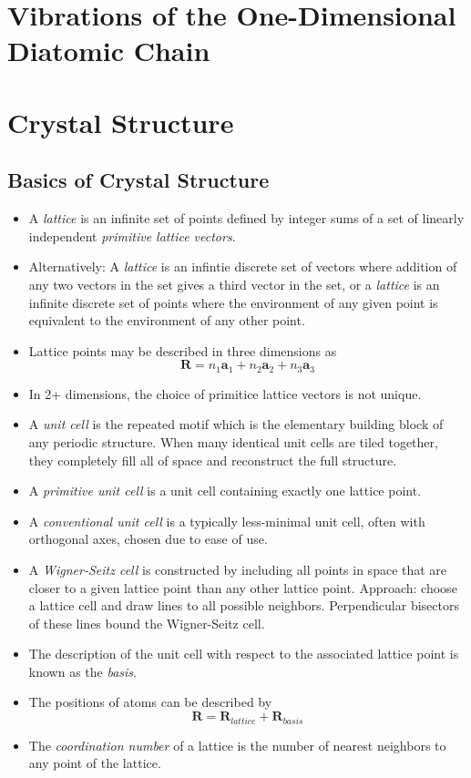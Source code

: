 \documentclass[10pt]{article}
\begin{document}
\section{Vibrations of the One-Dimensional Diatomic Chain}


\section{Crystal Structure}
\subsection{Basics of Crystal Structure}
\begin{itemize}
\item A \emph{lattice} is an infinite set of points defined by integer sums of a set of linearly
independent \emph{primitive lattice vectors}.
\item Alternatively: A \emph{lattice} is an infintie discrete set of vectors where addition of
any two vectors in the set gives a third vector in the set, or a \emph{lattice} is an infinite
discrete set of points where the environment of any given point is equivalent to the environment
of any other point.
\item Lattice points may be described in three dimensions as
$$\textbf{R} = n_{1}\textbf{a}_{1} + n_{2}\textbf{a}_2 + n_{3}\textbf{a}_{3}$$
\item In 2+ dimensions, the choice of primitice lattice vectors is not unique.
\end{itemize}

\begin{itemize}
  \item A \emph{unit cell} is the repeated motif which is the elementary building block of
  any periodic structure. When many identical unit cells are tiled together, they
  completely fill all of space and reconstruct the full structure.
  \item A \emph{primitive unit cell} is a unit cell containing exactly one lattice point.
  \item A \emph{conventional unit cell} is a typically less-minimal unit cell, often
  with orthogonal axes, chosen due to ease of use.
  \item A \emph{Wigner-Seitz cell} is constructed by including all points in space that are
  closer to a given lattice point than any other lattice point. Approach: choose a lattice cell
  and draw lines to all possible neighbors. Perpendicular bisectors of these lines bound the
  Wigner-Seitz cell.
  \item The description of the unit cell with respect to the associated lattice point is
  known as the \emph{basis}.
  \item The positions of atoms can be described by
  $$ \textbf{R} = \textbf{R}_{lattice} + \textbf{R}_{basis} $$
  \item The \emph{coordination number} of a lattice is the number of nearest neighbors to any point of the lattice.
\end{itemize}
\end{document}
